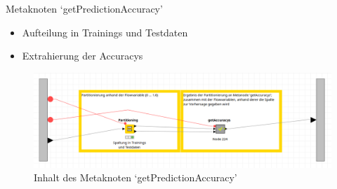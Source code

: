 \documentclass[
	handout,
  	aspectratio=169
]{beamer}
\begin{document}
			\begin{frame}{Metaknoten `getPredictionAccuracy'}
				\begin{itemize}
					\item Aufteilung in Trainings und Testdaten	
					\item Extrahierung der Accuracys
				\end{itemize}
				\begin{center}					
					\begin{figure}[h]
						\includegraphics[scale=0.25]{../pictures/trees-workflow-partitioning.png}
						\caption{Inhalt des Metaknoten `getPredictionAccuracy'}		
					\end{figure}	
				\end{center}	
			\end{frame}
			
\end{document}
